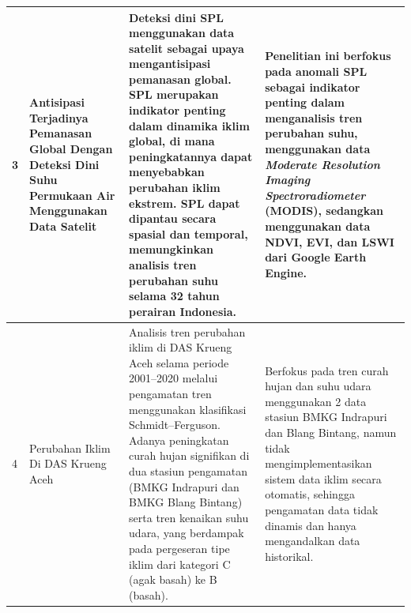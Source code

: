 \begin{longtable}{|p{}|p{}|p{}|p{}|}
3 & Antisipasi Terjadinya Pemanasan Global Dengan Deteksi Dini Suhu Permukaan Air Menggunakan Data Satelit \parencite{mulyani2021} & Deteksi dini SPL menggunakan data satelit sebagai upaya mengantisipasi pemanasan global. SPL merupakan indikator penting dalam dinamika iklim global, di mana peningkatannya dapat menyebabkan perubahan iklim ekstrem. SPL dapat dipantau secara spasial dan temporal, memungkinkan analisis tren perubahan suhu selama 32 tahun perairan Indonesia. & Penelitian ini berfokus pada anomali SPL sebagai indikator penting dalam menganalisis tren perubahan suhu, menggunakan data \textit{Moderate Resolution Imaging Spectroradiometer} (MODIS), sedangkan \saya{} menggunakan data NDVI, EVI, dan LSWI dari Google Earth Engine. \\ \hline

4 & Perubahan Iklim Di DAS Krueng Aceh \parencite{safitri2023} & Analisis tren perubahan iklim di DAS Krueng Aceh selama periode 2001–2020 melalui pengamatan tren menggunakan klasifikasi Schmidt–Ferguson. Adanya peningkatan curah hujan signifikan di dua stasiun pengamatan (BMKG Indrapuri dan BMKG Blang Bintang) serta tren kenaikan suhu udara, yang berdampak pada pergeseran tipe iklim dari kategori C (agak basah) ke B (basah). & Berfokus pada tren curah hujan dan suhu udara menggunakan 2 data stasiun BMKG Indrapuri dan Blang Bintang, namun tidak mengimplementasikan sistem data iklim secara otomatis, sehingga pengamatan data tidak dinamis dan hanya mengandalkan data historikal. \\ \hline
\end{longtable}

\vspace*{0.8cm} 
